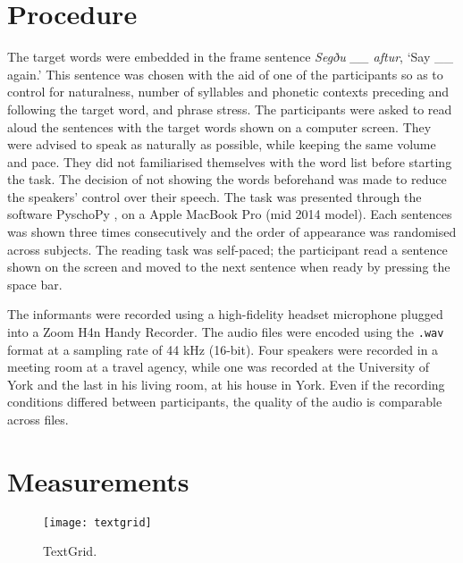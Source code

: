 

\section{Procedure}

The target words were embedded in the frame sentence \textit{Segðu \_\_ aftur}, `Say \_\_ again.'
This sentence was chosen with the aid of one of the participants so as to control for naturalness, number of syllables and phonetic contexts preceding and following the target word, and phrase stress.
The participants were asked to read aloud the sentences with the target words shown on a computer screen.
They were advised to speak as naturally as possible, while keeping the same volume and pace.
They did not familiarised themselves with the word list before starting the task.
The decision of not showing the words beforehand was made to reduce the speakers' control over their speech.
The task was presented through the software PyschoPy \citep{peirce2009}, on a Apple MacBook Pro (mid 2014 model).
Each sentences was shown three times consecutively and the order of appearance was randomised across subjects.
The reading task was self-paced; the participant read a sentence shown on the screen and moved to the next sentence when ready by pressing the space bar.

The informants were recorded using a high-fidelity headset microphone plugged into a Zoom H4n Handy Recorder.
The audio files were encoded using the \texttt{.wav} format at a sampling rate of 44 kHz (16-bit).
Four speakers were recorded in a meeting room at a travel agency, while one was recorded at the University of York and the last in his living room, at his house in York.
Even if the recording conditions differed between participants, the quality of the audio is comparable across files.

\section{Measurements}

\begin{figure}
\centering
\texttt{[image: textgrid]}
\caption{TextGrid.}
\label{f:textgrid}
\end{figure}

